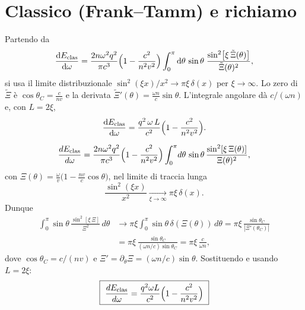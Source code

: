 \documentclass[11pt,a4paper]{article}
\newcommand{\vv}{v}
\newcommand{\cc}{c}
\newcommand{\nn}{n}
\newcommand{\om}{\omega}
\newcommand{\w}{\omega}
\newcommand{\Eclas}{E_{\text{clas}}}
\newcommand{\dd}{\mathrm{d}}
\begin{document}
\section{Classico (Frank--Tamm) e richiamo}
Partendo da
\begin{equation}
\frac{\dd \Eclas}{\dd \w}=\frac{2 n \w^{2} q^{2}}{\pi c^{3}}\Bigl(1-\frac{c^{2}}{n^{2}v^{2}}\Bigr)\int_{0}^{\pi}\dd\theta\,\sin\theta\;
\frac{\sin^{2}\bigl[\xi\,\tilde{\Xi}(\theta)\bigr]}{\tilde{\Xi}(\theta)^{2}},
\end{equation}
si usa il limite distribuzionale $\sin^{2}(\xi x)/x^{2}\to \pi\xi\,\delta(x)$ per $\xi\to\infty$. Lo zero di $\tilde{\Xi}$ è $\cos\theta_C=\tfrac{c}{nv}$ e la derivata $\tilde{\Xi}'(\theta)=\tfrac{\w n}{c}\sin\theta$. L'integrale angolare dà $c/(\w n)$ e, con $L=2\xi$,
\begin{equation}
\frac{\dd \Eclas}{\dd \w}=\frac{q^{2}\,\w\,L}{c^{2}}\Bigl(1-\frac{c^{2}}{n^{2}v^{2}}\Bigr).
\end{equation}

\begin{equation}
\frac{dE_{\rm clas}}{d\om}=
\frac{2\nn\om^2 q^2}{\pi \cc^3}\Bigl(1-\frac{\cc^2}{\nn^2\vv^2}\Bigr)
\int_0^\pi \! d\theta \,\sin\theta\,\frac{\sin^2[\xi\,\Xi(\theta)]}{\Xi(\theta)^2},
\end{equation}
con $\Xi(\theta)=\frac{\om}{\vv}\bigl(1-\frac{\nn \vv}{\cc}\cos\theta\bigr)$, nel limite di traccia lunga
\begin{equation}
\frac{\sin^2(\xi x)}{x^2}\xrightarrow[\xi\to\infty]{}\pi\xi\,\delta(x).
\end{equation}
Dunque
\begin{align}
\int_0^\pi \!\sin\theta\,\frac{\sin^2[\xi\,\Xi]}{\Xi^2}\,d\theta
&\to \pi\xi\int_0^\pi \!\sin\theta\,\delta(\Xi(\theta))\,d\theta
=\pi\xi\,\frac{\sin\theta_C}{|\Xi'(\theta_C)|} \\
&=\pi\xi\,\frac{\sin\theta_C}{(\om \nn/\cc)\sin\theta_C}
=\pi\xi\,\frac{\cc}{\om \nn},
\end{align}
dove $\cos\theta_C=\cc/(\nn \vv)$ e $\Xi'=\partial_\theta \Xi=(\om \nn/\cc)\sin\theta$.
Sostituendo e usando $L=2\xi$:
\begin{equation}
\boxed{\ \frac{dE_{\rm clas}}{d\om}=\frac{q^2\om L}{\cc^2}\Bigl(1-\frac{\cc^2}{\nn^2\vv^2}\Bigr)\ }
\end{equation}
\end{document}
